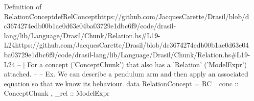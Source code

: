 \begin{haskell}{Definition of RelationConcept}{defRelConcept}{https://github.com/JacquesCarette/Drasil/blob/dc3674274edb00b1ae0d63e04ba03729e1dbc\linebreak{}6f9/code/drasil-lang/lib/Language/Drasil/Chunk/Relation.hs\#L19-L24}{https://github.com/JacquesCarette/Drasil/blob/dc3674274edb00b1ae0d63e04ba03729e1dbc6f9/code/drasil-lang/lib/Language/Drasil/Chunk/Relation.hs\#L19-L24}
-- | For a concept ('ConceptChunk') that also has a 'Relation' ('ModelExpr') attached.
--
-- Ex. We can describe a pendulum arm and then apply an associated equation so that we know its behaviour.
data RelationConcept = RC { _conc :: ConceptChunk
                          , _rel  :: ModelExpr
                          }
\end{haskell}

